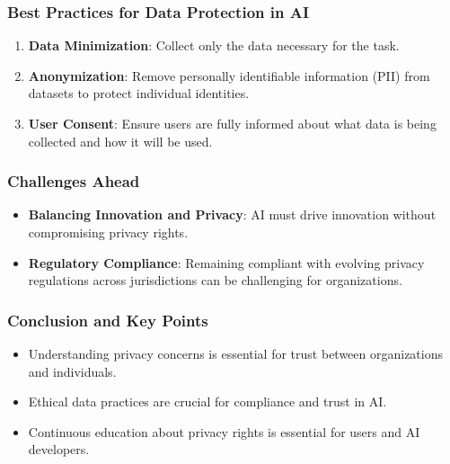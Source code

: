 \documentclass{beamer}
\begin{document}
\begin{frame}[fragile]
    \frametitle{Best Practices for Data Protection in AI}
    \begin{enumerate}
        \item \textbf{Data Minimization}: 
        Collect only the data necessary for the task.
        
        \item \textbf{Anonymization}: 
        Remove personally identifiable information (PII) from datasets to protect individual identities.
        
        \item \textbf{User Consent}: 
        Ensure users are fully informed about what data is being collected and how it will be used.
    \end{enumerate}
\end{frame}

\begin{frame}[fragile]
    \frametitle{Challenges Ahead}
    \begin{itemize}
        \item \textbf{Balancing Innovation and Privacy}: 
        AI must drive innovation without compromising privacy rights.
        
        \item \textbf{Regulatory Compliance}: 
        Remaining compliant with evolving privacy regulations across jurisdictions can be challenging for organizations.
    \end{itemize}
\end{frame}

\begin{frame}[fragile]
    \frametitle{Conclusion and Key Points}
    \begin{itemize}
        \item Understanding privacy concerns is essential for trust between organizations and individuals.
        \item Ethical data practices are crucial for compliance and trust in AI.
        \item Continuous education about privacy rights is essential for users and AI developers.
    \end{itemize}
\end{frame}
\end{document}
